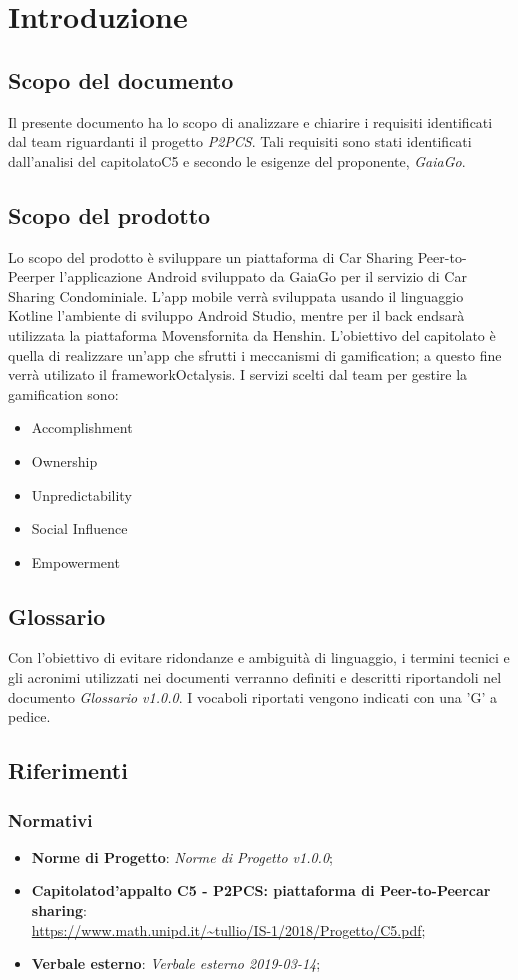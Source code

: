 \section{Introduzione} 
\subsection{Scopo del documento}
Il presente documento ha lo scopo di analizzare e chiarire i requisiti identificati dal team riguardanti il progetto \textit{P2PCS}. Tali requisiti sono stati identificati dall'analisi del capitolato\glosp C5 e secondo le esigenze del proponente, \textit{GaiaGo}.
\subsection{Scopo del prodotto}
Lo scopo del prodotto è sviluppare un piattaforma di Car Sharing Peer-to-Peer\glosp  per l'applicazione Android sviluppato da GaiaGo per il servizio di Car Sharing Condominiale. L'app mobile verrà sviluppata usando il linguaggio Kotlin\glosp e l'ambiente di sviluppo Android Studio, mentre per il back end\glosp sarà utilizzata la piattaforma Movens\glosp fornita da Henshin\glo. L'obiettivo del capitolato è quella di realizzare un’app che sfrutti i meccanismi di gamification\glo; a questo fine verrà utilizato il framework\glosp Octalysis\glo. I servizi scelti dal team per gestire la gamification sono:
\begin{itemize}
	\item {Accomplishment}
	\item {Ownership}
	\item {Unpredictability}
	\item {Social Influence}
	\item {Empowerment}
\end{itemize}

\subsection{Glossario}
Con l’obiettivo di evitare ridondanze e ambiguità di linguaggio, i termini tecnici e gli acronimi utilizzati nei documenti verranno definiti e descritti riportandoli nel documento \textit{Glossario v1.0.0}.  I vocaboli riportati vengono indicati con una 'G' a pedice.
\subsection{Riferimenti}
\subsubsection{Normativi}
\begin{itemize}
	\item \textbf{Norme di Progetto}: \textit{Norme di Progetto v1.0.0};

	\item \textbf{Capitolato\glosp d'appalto C5 - P2PCS: piattaforma di Peer-to-Peer\glosp car sharing}: \\ \url{ https://www.math.unipd.it/~tullio/IS-1/2018/Progetto/C5.pdf};
	\item \textbf{Verbale esterno}: \textit{Verbale esterno 2019-03-14};

\end{itemize}
